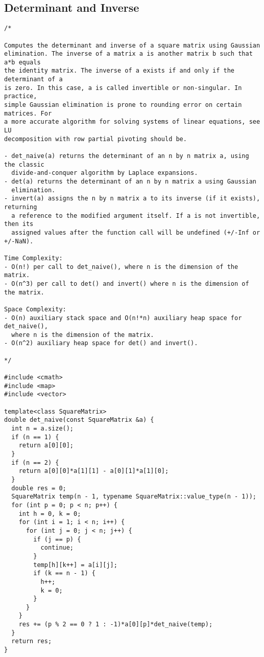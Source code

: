 \subsection{Determinant and Inverse}
\begin{lstlisting}
/*

Computes the determinant and inverse of a square matrix using Gaussian
elimination. The inverse of a matrix a is another matrix b such that a*b equals
the identity matrix. The inverse of a exists if and only if the determinant of a
is zero. In this case, a is called invertible or non-singular. In practice,
simple Gaussian elimination is prone to rounding error on certain matrices. For
a more accurate algorithm for solving systems of linear equations, see LU
decomposition with row partial pivoting should be.

- det_naive(a) returns the determinant of an n by n matrix a, using the classic
  divide-and-conquer algorithm by Laplace expansions.
- det(a) returns the determinant of an n by n matrix a using Gaussian
  elimination.
- invert(a) assigns the n by n matrix a to its inverse (if it exists), returning
  a reference to the modified argument itself. If a is not invertible, then its
  assigned values after the function call will be undefined (+/-Inf or +/-NaN).

Time Complexity:
- O(n!) per call to det_naive(), where n is the dimension of the matrix.
- O(n^3) per call to det() and invert() where n is the dimension of the matrix.

Space Complexity:
- O(n) auxiliary stack space and O(n!*n) auxiliary heap space for det_naive(),
  where n is the dimension of the matrix.
- O(n^2) auxiliary heap space for det() and invert().

*/

#include <cmath>
#include <map>
#include <vector>

template<class SquareMatrix>
double det_naive(const SquareMatrix &a) {
  int n = a.size();
  if (n == 1) {
    return a[0][0];
  }
  if (n == 2) {
    return a[0][0]*a[1][1] - a[0][1]*a[1][0];
  }
  double res = 0;
  SquareMatrix temp(n - 1, typename SquareMatrix::value_type(n - 1));
  for (int p = 0; p < n; p++) {
    int h = 0, k = 0;
    for (int i = 1; i < n; i++) {
      for (int j = 0; j < n; j++) {
        if (j == p) {
          continue;
        }
        temp[h][k++] = a[i][j];
        if (k == n - 1) {
          h++;
          k = 0;
        }
      }
    }
    res += (p % 2 == 0 ? 1 : -1)*a[0][p]*det_naive(temp);
  }
  return res;
}


\end{lstlisting}
